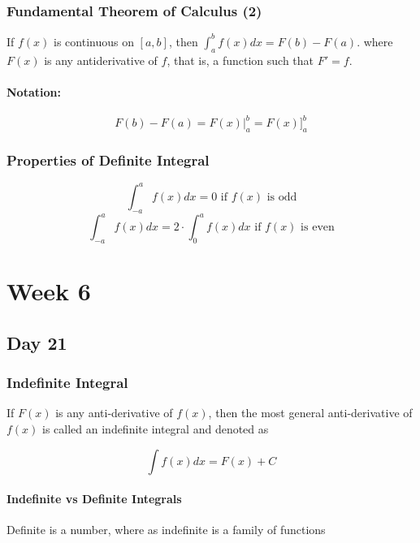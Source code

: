 \documentclass[12pt]{article}
\begin{document}
\subsubsection{Fundamental Theorem of Calculus (2)} 
If $f(x)$ is continuous on $[a,b]$, then $\int_a^b f(x)dx = F(b)-F(a)$. where   $F(x)$ is any antiderivative of $f$, that is, a function such that $F'=f$.

\paragraph{Notation:} 
$$F(b)-F(a) = F(x)\big|_a^b = F(x)\big]_a^b$$

\subsubsection{Properties of Definite Integral}
$$\int_{-a}^a f(x)dx = 0\text{ if } f(x) \text{ is odd}$$
$$\int_{-a}^a f(x)dx = 2\cdot\int_{0}^a f(x)dx \text{ if } f(x) \text{ is even}$$


\section{Week 6}

\subsection{Day 21}

\subsubsection{Indefinite Integral} If $F(x)$ is any anti-derivative of $f(x)$, then the most general anti-derivative of $f(x)$ is called an indefinite integral and denoted as 

$$\int f(x)dx = F(x) + C$$

\paragraph{Indefinite vs Definite Integrals} Definite is a number, where as indefinite is a family of functions
\end{document}
